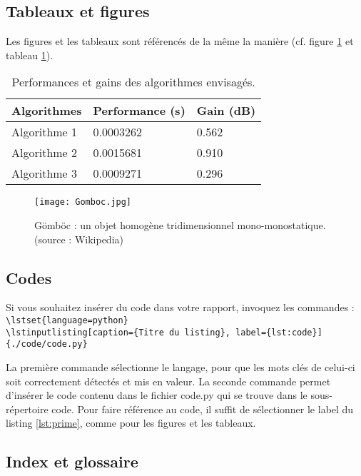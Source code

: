\subsection{Tableaux et figures}
Les figures  et les tableaux  sont référencés de la même la manière (cf. figure \ref{fig:gomboc} et tableau \ref{tab:exemple}).  

\begin{table}[h]
\centering
\begin{tabular}{lll}
\toprule
\textbf{Algorithmes} & \textbf{Performance (s)} & \textbf{Gain (dB)}\\
\midrule
Algorithme 1 & 0.0003262 & 0.562 \\
Algorithme 2 & 0.0015681 & 0.910 \\
Algorithme 3 & 0.0009271 & 0.296 \\
\bottomrule
\end{tabular}
\caption{\label{tab:exemple}Performances et gains des algorithmes envisagés.}
\end{table}

\begin{figure}[h]
\centering\texttt{[image: Gomboc.jpg]}
\caption{\label{fig:gomboc}Gömböc : un objet homogène tridimensionnel mono-monostatique. (source : Wikipedia)}
\end{figure}



\subsection{Codes}
Si vous souhaitez insérer du code dans votre rapport, invoquez les commandes : \\
 \texttt{\textbackslash lstset\{language=python\}}\\
 \texttt{\textbackslash lstinputlisting[caption=\{Titre du listing\}, label=\{lst:code\}]\{./code/code.py\}}


La première commande sélectionne le langage, pour que les mots clés de celui-ci soit correctement détectés et mis en valeur. 
La seconde commande permet d'insérer le code contenu dans le fichier code.py qui se trouve dans le sous-répertoire code.
Pour faire référence au code, il suffit de sélectionner le label du listing \ref{lst:prime},  comme pour les figures et les tableaux.

\lstset{language=python}



\subsection{Index et glossaire}


